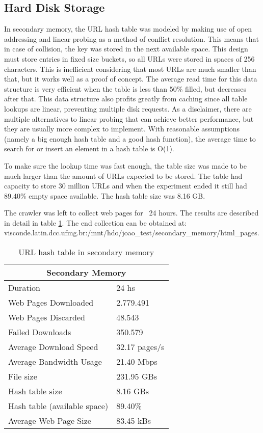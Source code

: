 \documentclass{report}
\begin{document}
\subsection{Hard Disk Storage}

In secondary memory, the URL hash table was modeled by making use of open addressing and linear probing as
a method of conflict resolution. This means that in case of collision, the key was stored in the next available space. 
This design must store entries in fixed size buckets, so all URLs were stored in spaces of 256 characters. 
This is inefficient considering that most URLs are much smaller than that, but it works well as a proof of concept. The average read
time for this data structure is very efficient when the table is less than 50\% filled, but decreases after that. This data structure
also profits greatly from caching since all table lookups are linear, preventing multiple disk requests. As a disclaimer, 
there are multiple alternatives to linear probing that can achieve better performance, but they are usually more complex to 
implement. With reasonable assumptions (namely a big enough hash table and a good hash function), the average time to
search for or insert an element in a hash table is O(1).

To make sure the lookup time was fast enough, the table size was made to be much larger than the amount of URLs 
expected to be stored. The table had capacity to store 30 million URLs and when the experiment ended it still had 89.40\% empty
space available. The hash table size was 8.16 GB.

The crawler was left to collect web pages for ~24 hours. The results are described
in detail in table \ref{tab:secondarymemory}. The end collection can be obtained at: \\
visconde.latin.dcc.ufmg.br:/mnt/hdo/joao\_test/secondary\_memory/html\_pages.

\begin{table}
\centering
\begin{tabular}{ |l|l| }
  \hline
  \multicolumn{2}{|c|}{Secondary Memory} \\
  \hline
  Duration & 24 hs \\
  Web Pages Downloaded & 2.779.491 \\
  Web Pages Discarded & 48.543 \\
  Failed Downloads & 350.579 \\
  Average Download Speed & 32.17 pages/s \\
  Average Bandwidth Usage & 21.40 Mbps \\
  File size & 231.95 GBs \\
  Hash table size & 8.16 GBs \\
  Hash table (available space) & 89.40\% \\
  Average Web Page Size & 83.45 kBs \\
  \hline
\end{tabular}
\caption{URL hash table in secondary memory}
\label{tab:secondarymemory}
\end{table}
\end{document}
